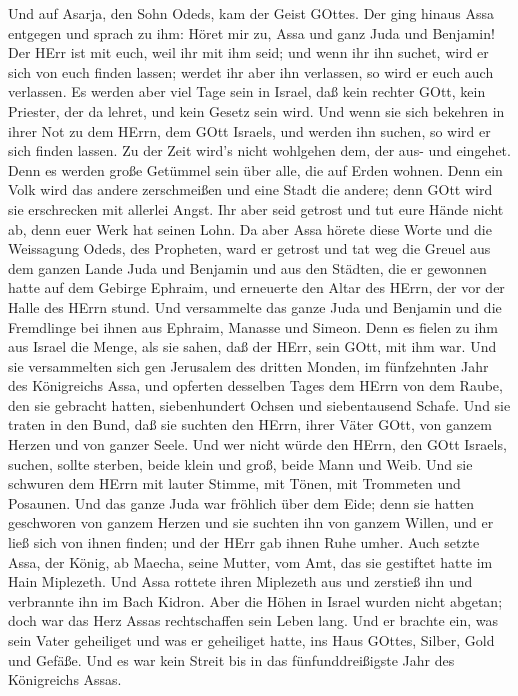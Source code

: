  Und auf Asarja, den Sohn Odeds, kam der Geist GOttes.
 Der ging hinaus Assa entgegen und sprach zu ihm: Höret mir
zu, Assa und ganz Juda und Benjamin! Der HErr ist mit euch, weil ihr mit
ihm seid; und wenn ihr ihn suchet, wird er sich von euch finden lassen;
werdet ihr aber ihn verlassen, so wird er euch auch verlassen.
 Es werden aber viel Tage sein in Israel, daß kein rechter
GOtt, kein Priester, der da lehret, und kein Gesetz sein wird.
 Und wenn sie sich bekehren in ihrer Not zu dem HErrn, dem
GOtt Israels, und werden ihn suchen, so wird er sich finden lassen.
 Zu der Zeit wird's nicht wohlgehen dem, der aus- und
eingehet. Denn es werden große Getümmel sein über alle, die auf Erden
wohnen.  Denn ein Volk wird das andere zerschmeißen und eine
Stadt die andere; denn GOtt wird sie erschrecken mit allerlei Angst.
 Ihr aber seid getrost und tut eure Hände nicht ab, denn
euer Werk hat seinen Lohn.  Da aber Assa hörete diese Worte
und die Weissagung Odeds, des Propheten, ward er getrost und tat weg die
Greuel aus dem ganzen Lande Juda und Benjamin und aus den Städten, die
er gewonnen hatte auf dem Gebirge Ephraim, und erneuerte den Altar des
HErrn, der vor der Halle des HErrn stund.  Und versammelte
das ganze Juda und Benjamin und die Fremdlinge bei ihnen aus Ephraim,
Manasse und Simeon. Denn es fielen zu ihm aus Israel die Menge, als sie
sahen, daß der HErr, sein GOtt, mit ihm war.  Und sie
versammelten sich gen Jerusalem des dritten Monden, im fünfzehnten Jahr
des Königreichs Assa,  und opferten desselben Tages dem
HErrn von dem Raube, den sie gebracht hatten, siebenhundert Ochsen und
siebentausend Schafe.  Und sie traten in den Bund, daß sie
suchten den HErrn, ihrer Väter GOtt, von ganzem Herzen und von ganzer
Seele.  Und wer nicht würde den HErrn, den GOtt Israels,
suchen, sollte sterben, beide klein und groß, beide Mann und Weib.
 Und sie schwuren dem HErrn mit lauter Stimme, mit Tönen,
mit Trommeten und Posaunen.  Und das ganze Juda war
fröhlich über dem Eide; denn sie hatten geschworen von ganzem Herzen und
sie suchten ihn von ganzem Willen, und er ließ sich von ihnen finden;
und der HErr gab ihnen Ruhe umher.  Auch setzte Assa, der
König, ab Maecha, seine Mutter, vom Amt, das sie gestiftet hatte im Hain
Miplezeth. Und Assa rottete ihren Miplezeth aus und zerstieß ihn und
verbrannte ihn im Bach Kidron.  Aber die Höhen in Israel
wurden nicht abgetan; doch war das Herz Assas rechtschaffen sein Leben
lang.  Und er brachte ein, was sein Vater geheiliget und
was er geheiliget hatte, ins Haus GOttes, Silber, Gold und Gefäße.
 Und es war kein Streit bis in das fünfunddreißigste Jahr
des Königreichs Assas.

